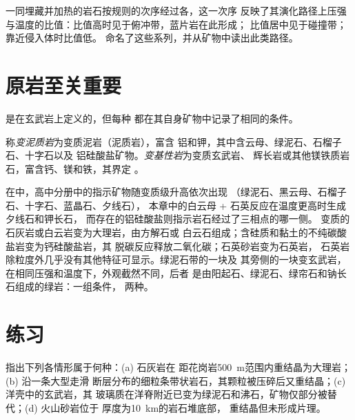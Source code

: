 一同埋藏并加热的岩石按规则的次序经过各，这一次序
反映了其演化路径上压强与温度的比值：比值高时见于俯冲带，蓝片岩在此形成；
比值居中见于碰撞带；靠近侵入体时比值低。
命名了这些系列，并从矿物中读出此类路径。

\section{原岩至关重要}\label{sec:b2:metamorphic-facies:protoliths}

是在玄武岩上定义的，但每种
都在其自身矿物中记录了相同的条件。

\begin{definition}\label{def:b2:metamorphic-facies:protoliths}
称\emph{变泥质岩}为变质泥岩（泥质岩），富含
铝和钾，其中含云母、绿泥石、石榴子石、十字石以及
铝硅酸盐矿物。\emph{变基性岩}为变质玄武岩、
辉长岩或其他镁铁质岩石，富含钙、镁和铁，其界定
。
\end{definition}

在中，高中分册中的指示矿物随变质级升高依次出现
（绿泥石、黑云母、石榴子石、十字石、蓝晶石、夕线石），
本章中的白云母 + 石英反应在温度更高时生成夕线石和钾长石，
而存在的铝硅酸盐则指示岩石经过了三相点的哪一侧。
变质的石灰岩或白云岩变为大理岩，由方解石或
白云石组成；含硅质和黏土的不纯碳酸盐岩变为钙硅酸盐岩，其
脱碳反应释放二氧化碳；石英砂岩变为石英岩，
石英岩除粒度外几乎没有其他特征可显示。绿泥石带的一块及
其旁侧的一块变玄武岩，在相同压强和温度下，外观截然不同，后者
是由阳起石、绿泥石、绿帘石和钠长石组成的绿岩：一组条件，
两种。

\section{练习}

\begin{exercise}[$\star$]\label{exo:b2:metamorphic-facies:1}
指出下列各情形属于何种：(a) 石灰岩在
距花岗岩\qty{500}{m}范围内重结晶为大理岩；(b) 沿一条大型走滑
断层分布的细粒条带状岩石，其颗粒被压碎后又重结晶；(c) 洋壳中的玄武岩，其
玻璃质在洋脊附近已变为绿泥石和沸石，矿物仅部分被替代；(d) 火山砂岩位于
厚度为\qty{10}{km}的岩石堆底部，
重结晶但未形成片理。
\end{exercise}

